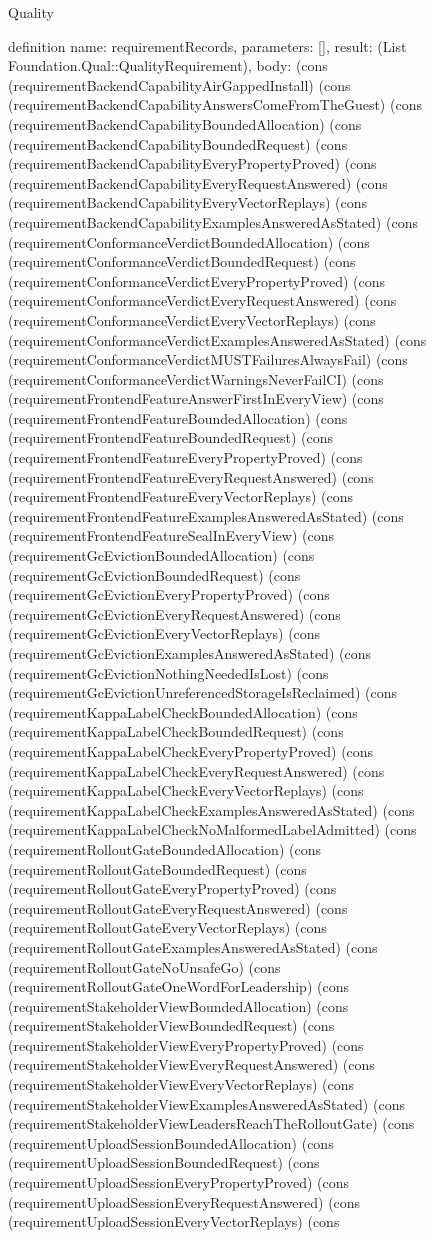 \begin{lexlean}{Quality}
\begin{semanticmodule}
definition{
  name: requirementRecords,
  parameters: [],
  result: (List Foundation.Qual::QualityRequirement),
  body: (cons (requirementBackendCapabilityAirGappedInstall) (cons (requirementBackendCapabilityAnswersComeFromTheGuest) (cons (requirementBackendCapabilityBoundedAllocation) (cons (requirementBackendCapabilityBoundedRequest) (cons (requirementBackendCapabilityEveryPropertyProved) (cons (requirementBackendCapabilityEveryRequestAnswered) (cons (requirementBackendCapabilityEveryVectorReplays) (cons (requirementBackendCapabilityExamplesAnsweredAsStated) (cons (requirementConformanceVerdictBoundedAllocation) (cons (requirementConformanceVerdictBoundedRequest) (cons (requirementConformanceVerdictEveryPropertyProved) (cons (requirementConformanceVerdictEveryRequestAnswered) (cons (requirementConformanceVerdictEveryVectorReplays) (cons (requirementConformanceVerdictExamplesAnsweredAsStated) (cons (requirementConformanceVerdictMUSTFailuresAlwaysFail) (cons (requirementConformanceVerdictWarningsNeverFailCI) (cons (requirementFrontendFeatureAnswerFirstInEveryView) (cons (requirementFrontendFeatureBoundedAllocation) (cons (requirementFrontendFeatureBoundedRequest) (cons (requirementFrontendFeatureEveryPropertyProved) (cons (requirementFrontendFeatureEveryRequestAnswered) (cons (requirementFrontendFeatureEveryVectorReplays) (cons (requirementFrontendFeatureExamplesAnsweredAsStated) (cons (requirementFrontendFeatureSealInEveryView) (cons (requirementGcEvictionBoundedAllocation) (cons (requirementGcEvictionBoundedRequest) (cons (requirementGcEvictionEveryPropertyProved) (cons (requirementGcEvictionEveryRequestAnswered) (cons (requirementGcEvictionEveryVectorReplays) (cons (requirementGcEvictionExamplesAnsweredAsStated) (cons (requirementGcEvictionNothingNeededIsLost) (cons (requirementGcEvictionUnreferencedStorageIsReclaimed) (cons (requirementKappaLabelCheckBoundedAllocation) (cons (requirementKappaLabelCheckBoundedRequest) (cons (requirementKappaLabelCheckEveryPropertyProved) (cons (requirementKappaLabelCheckEveryRequestAnswered) (cons (requirementKappaLabelCheckEveryVectorReplays) (cons (requirementKappaLabelCheckExamplesAnsweredAsStated) (cons (requirementKappaLabelCheckNoMalformedLabelAdmitted) (cons (requirementRolloutGateBoundedAllocation) (cons (requirementRolloutGateBoundedRequest) (cons (requirementRolloutGateEveryPropertyProved) (cons (requirementRolloutGateEveryRequestAnswered) (cons (requirementRolloutGateEveryVectorReplays) (cons (requirementRolloutGateExamplesAnsweredAsStated) (cons (requirementRolloutGateNoUnsafeGo) (cons (requirementRolloutGateOneWordForLeadership) (cons (requirementStakeholderViewBoundedAllocation) (cons (requirementStakeholderViewBoundedRequest) (cons (requirementStakeholderViewEveryPropertyProved) (cons (requirementStakeholderViewEveryRequestAnswered) (cons (requirementStakeholderViewEveryVectorReplays) (cons (requirementStakeholderViewExamplesAnsweredAsStated) (cons (requirementStakeholderViewLeadersReachTheRolloutGate) (cons (requirementUploadSessionBoundedAllocation) (cons (requirementUploadSessionBoundedRequest) (cons (requirementUploadSessionEveryPropertyProved) (cons (requirementUploadSessionEveryRequestAnswered) (cons (requirementUploadSessionEveryVectorReplays) (cons }
\end{semanticmodule}
\end{lexlean}
